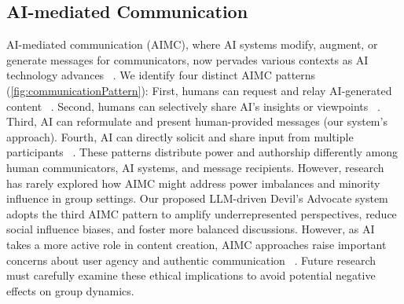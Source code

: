 \subsection{AI-mediated Communication}
AI-mediated communication (AIMC), where AI systems modify, augment, or generate messages for communicators, now pervades various contexts as AI technology advances ~\cite{hancockAIMediatedCommunicationDefinition2020}. We identify four distinct AIMC patterns (\autoref{fig:communicationPattern}): First, humans can request and relay AI-generated content ~\cite{hancockAIMediatedCommunicationDefinition2020}. Second, humans can selectively share AI's insights or viewpoints ~\cite{doHowShouldAgent2022}. Third, AI can reformulate and present human-provided messages (our system's approach). Fourth, AI can directly solicit and share input from multiple participants ~\cite{wangUnderstandingDesignSpace2022,natarajanHumanintheloopAIintheloopAutomate2024}. These patterns distribute power and authorship differently among human communicators, AI systems, and message recipients. However, research has rarely explored how AIMC might address power imbalances and minority influence in group settings. Our proposed LLM-driven Devil's Advocate system adopts the third AIMC pattern to amplify underrepresented perspectives, reduce social influence biases, and foster more balanced discussions. However, as AI takes a more active role in content creation, AIMC approaches raise important concerns about user agency and authentic communication ~\cite{mieczkowskiAIMediatedCommunicationLanguage2021,poddarAIWritingAssistants2023,hohensteinArtificialIntelligenceCommunication2023,robertsonCantReplyThat2021}. Future research must carefully examine these ethical implications to avoid potential negative effects on group dynamics.